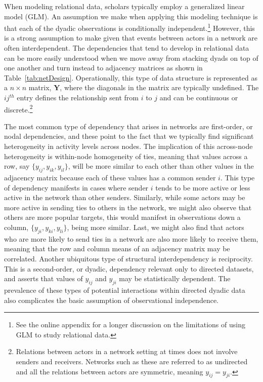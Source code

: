 \documentclass[11pt,pdflatex]{elsarticle}
\begin{document}
When modeling relational data, scholars typically employ a generalized linear model (GLM). An assumption we make when applying this modeling technique is that each of the dyadic observations is conditionally independent.\footnote{See the online appendix for a longer discussion on the limitations of using GLM to study relational data.} However, this is a strong assumption to make given that events between actors in a network are often interdependent. The dependencies that tend to develop in relational data can be more easily understood when we move away from stacking dyads on top of one another and turn instead to adjacency matrices as shown in Table~\ref{tab:netDesign}. Operationally, this type of data structure is represented as a $n \times n$ matrix, $\mathbf{Y}$, where the diagonals in the matrix are typically undefined. The $ij^{th}$ entry defines the relationship sent from $i$ to $j$ and can be continuous or discrete.\footnote{Relations between actors in a network setting at times does not involve senders and receivers. Networks such as these are referred to as undirected and all the relations between actors are symmetric, meaning $y_{ij}=y_{ji}$.}

The most common type of dependency that arises in networks are first-order, or nodal dependencies, and these point to the fact that we typically find significant heterogeneity in activity levels across nodes. The implication of this across-node heterogeneity is within-node homogeneity of ties, meaning that values across a row, say $\{y_{ij},y_{ik},y_{il}\}$, will be more similar to each other than other values in the adjacency matrix because each of these values has a common sender $i$. This type of dependency manifests in cases where sender $i$ tends to be more active or less active in the network than other senders. Similarly, while some actors may be more active in sending ties to others in the network, we might also observe that others are more popular targets, this would manifest in observations down a column, $\{y_{ji},y_{ki},y_{li}\}$, being more similar. Last, we might also find that actors who are more likely to send ties in a network are also more likely to receive them, meaning that the row and column means of an adjacency matrix may be correlated. Another ubiquitous type of structural interdependency is reciprocity. This is a second-order, or dyadic, dependency relevant only to directed datasets, and asserts that values of $y_{ij}$ and $y_{ji}$ may be statistically dependent. The prevalence of these types of potential interactions within directed dyadic data also complicates the basic assumption of observational independence.
\end{document}
